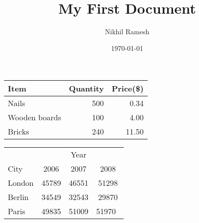 \documentclass[a4paper,12pt]{article}
\begin{document}
\title{My First Document}
\author{Nikhil Ramesh}
\date{\today}
\maketitle





\begin{tabular}{l|r|r}
Item&Quantity&Price(\$)\\
\hline
Nails&500&0.34\\
Wooden boards&100&4.00\\
Bricks&240&11.50\\
\end{tabular}
 \newpage
\begin{tabular}{l|ccc}
&&Year&\\
\cline{2-4}
City&2006&2007&2008\\
\hline
London&45789&46551&51298\\
Berlin&34549&32543&29870\\
Paris&49835&51009&51970\
\end{tabular}
\end{document}
